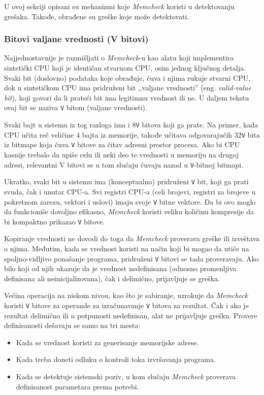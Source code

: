 \documentclass[12pt,oneside]{memoir}
\theoremstyle{plain}
\theoremstyle{definition}
\begin{document}
U ovoj sekciji opisani su mehanizmi koje \textit{Memcheck} koristi u detektovanju grešaka. Takođe, obrađene su greške koje može detektovati.

\subsubsection{Bitovi valjane vrednosti (V bitovi)}
Najjednostavnije je razmišljati o \textit{Memcheck}-u kao alatu koji implementira sintetički CPU koji je identičan stvarnom CPU, osim jednog ključnog detalja. Svaki bit (doslovno) podataka koje obrađuje, čuva i njima rukuje stvarni CPU, dok u sintetičkom CPU ima pridruženi bit ,,valjane vrednosti'' (eng. \textit{valid-value bit}), koji govori da li prateći bit ima legitimnu vrednost ili ne. U daljem tekstu ovaj bit se naziva \texttt{V} bitom (valjane vrednosti).

Svaki bajt u sistemu iz tog razloga ima i 8\texttt{V} bitova koji ga prate. Na primer, kada CPU učita reč veličine 4 bajta iz memorije, takođe učitava odgovarajućih 32\texttt{V} bita iz bitmape koja čuva \texttt{V} bitove za čitav adresni prostor procesa. Ako bi CPU kasnije trebalo da upiše celu ili neki deo te vrednosti u memoriju na drugoj adresi, relevantni V bitovi se u tom slučaju čuvaju nazad u \texttt{V}-bitnoj bitmapi.

Ukratko, svaki bit u sistemu ima (konceptualno) pridruženi \texttt{V} bit, koji ga prati svuda, čak i unutar CPU-a. Svi registri CPU-a (celi brojevi, registri za brojeve u pokretnom zarezu, vektori i uslovi) imaju svoje \texttt{V} bitne vektore. Da bi ovo moglo da funkcioniše dovoljno efikasno, \textit{Memcheck} koristi veliku količinu kompresije da bi kompaktno prikazao \texttt{V} bitove.

Kopiranje vrednosti ne dovodi do toga da \textit{Memcheck} proverava greške ili izveštava o njima. Međutim, kada se vrednost koristi na način koji bi mogao da utiče na spoljno-vidljivo ponašanje programa, pridruženi \texttt{V} bitovi se tada proveravaju. Ako bilo koji od njih ukazuje da je vrednost nedefinisana (odnosno promenljiva definisana ali neinicijalizovana), čak i delimično, prijavljuje se greška.

Većina operacija na niskom nivou, kao što je sabiranje, uzrokuje da \textit{Memcheck} koristi \texttt{V} bitove za operande za izračunavanje \texttt{V} bitova za rezultat. Čak i ako je rezultat delimično ili u potpunosti nedefinisan, alat ne prijavljuje grešku. Provere definisanosti dešavaju se samo na tri mesta:
\begin{itemize}
\item  Kada se vrednost koristi za generisanje memorijske adrese.
\item  Kada treba doneti odluku o kontroli toka izvršavanja programa. 
\item  Kada se detektuje sistemski poziv, u kom slučaju \textit{Memcheck} proverava definisanost parametara prema potrebi.
\end{itemize}
\end{document}
